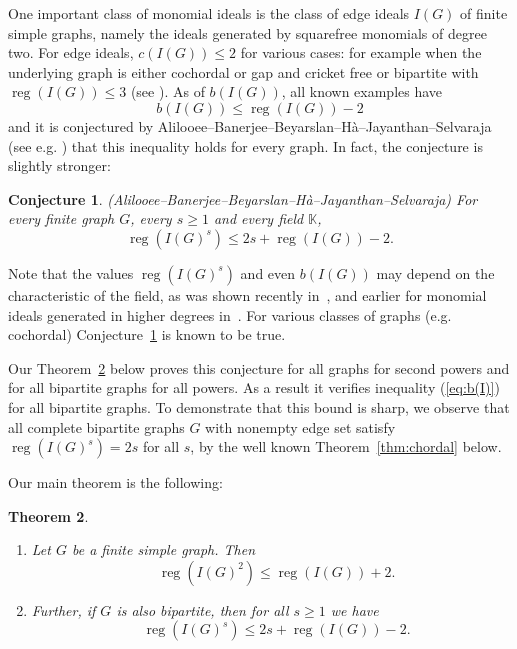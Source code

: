 \documentclass[10pt]{article}
\newtheorem{theorem}{Theorem}[section]
\newtheorem{conj}[theorem]{Conjecture}
\theoremstyle{definition}
\numberwithin{equation}{section}
\newcommand \reg{\operatorname{reg}}
\newcommand \K{\mathbb{K}}
\begin{document}
 One important class of monomial ideals is the class of edge ideals $I(G)$ of finite simple graphs, namely the ideals generated by squarefree monomials of degree two. For edge ideals, $c(I(G))\le 2$ for various cases: for example when the underlying graph is either cochordal or gap and cricket free or bipartite with $\reg(I(G))\leq 3$
 (see \cite{banerjee1,banerjee,BBH17,froberg}). %
 As of $b(I(G))$, all known examples have
 \begin{equation}\label{eq:b(I)}
b(I(G))\leq \reg(I(G))-2
 \end{equation}
 and it is conjectured by Alilooee--Banerjee--Beyarslan--H\`a--Jayanthan--Selvaraja (see e.g. \cite{BBH17,JS18}) that this inequality holds for every graph.  In fact, the conjecture is
slightly stronger:
\begin{conj}\label{conj:byMany}\textup{(Alilooee--Banerjee--Beyarslan--H\`a--Jayanthan--Selvaraja)}
For every finite graph $G$, every $s\geq 1$ and every field $\K$,  $$\reg(I(G)^s)\leq 2s+ \reg(I(G))-2.$$
\end{conj}
Note that the values $\reg(I(G)^s)$ and even $b(I(G))$ may depend on the characteristic of the field, as was shown recently in~\cite[Exa. 1.2]{minh_vu}, and earlier for monomial ideals generated in higher degrees in~\cite{machia}.
For various classes of graphs (e.g. cochordal)
 Conjecture~\ref{conj:byMany} is known to be true.

  Our Theorem~\ref{thm:main} below proves this conjecture for all graphs for second powers and for all bipartite graphs for all powers. As a result it verifies inequality (\ref{eq:b(I)}) for all bipartite graphs.
 To demonstrate that this bound is sharp, we observe that all complete bipartite graphs $G$ with nonempty edge set satisfy $\reg(I(G)^s)=2s$ for all $s$, by the well known Theorem~\ref{thm:chordal} below.


 Our main theorem is the following:
\begin{theorem}
\begin{enumerate}[label=(\roman*)]
\item \label{it:1} Let $G$ be a finite simple graph. Then
$$ \text{ }\reg(I(G)^2) \leq \reg (I(G))+2.$$
\item \label{it:2} Further, if $G$ is also bipartite, then for all $s\geq 1$ we have $$\text{ } \reg(I(G)^s) \leq 2s+\reg (I(G))-2.$$
\end{enumerate}
\label{thm:main}
\end{theorem}
\end{document}
